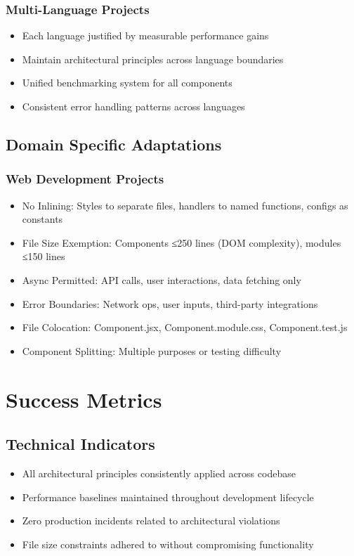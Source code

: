 \documentclass{article}
\begin{document}
\subsubsection{Multi-Language Projects}
\begin{itemize}[noitemsep]
\item Each language justified by measurable performance gains
\item Maintain architectural principles across language boundaries
\item Unified benchmarking system for all components
\item Consistent error handling patterns across languages
\end{itemize}

\subsection{Domain Specific Adaptations}

\subsubsection{Web Development Projects}
\begin{itemize}[noitemsep]
\item No Inlining: Styles to separate files, handlers to named functions, configs as constants
\item File Size Exemption: Components ≤250 lines (DOM complexity), modules ≤150 lines
\item Async Permitted: API calls, user interactions, data fetching only
\item Error Boundaries: Network ops, user inputs, third-party integrations
\item File Colocation: Component.jsx, Component.module.css, Component.test.js
\item Component Splitting: Multiple purposes or testing difficulty
\end{itemize}

\section{Success Metrics}

\subsection{Technical Indicators}
\begin{itemize}[noitemsep]
\item All architectural principles consistently applied across codebase
\item Performance baselines maintained throughout development lifecycle
\item Zero production incidents related to architectural violations
\item File size constraints adhered to without compromising functionality
\end{itemize}
\end{document}
